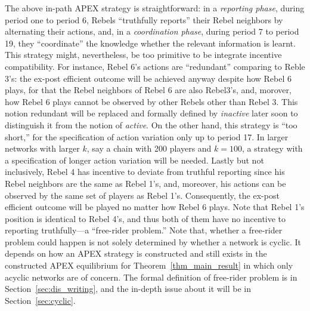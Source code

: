 \documentclass[12pt,letter]{article}
\theoremstyle{definition}
\theoremstyle{remark}
\theoremstyle{claim}
\begin{document}
The above in-path APEX strategy is straightforward: in a \textit{reporting phase}, during period one to period 6, Rebels ``truthfully reports'' their Rebel neighbors by alternating their actions, and, in a \textit{coordination phase}, during period 7 to period 19, they ``coordinate'' the knowledge whether the relevant information is learnt. This strategy might, nevertheless, be too primitive to be integrate incentive compatibility. For instance, Rebel 6's actions are ``redundant'' comparing to Reble 3's: the ex-post efficient outcome will be achieved anyway despite how Rebel 6 plays, for that the Rebel neighbors of Rebel 6 are also Rebel3's, and, morover, how Rebel 6 plays cannot be observed by other Rebels other than Rebel 3. This notion redundant will be replaced and formally defined by \textit{inactive} later soon to distinguish it from the notion of \textit{active}. On the other hand, this strategy is ``too short,'' for the specification of action variation only up to period 17. In larger networks with larger $k$, say a chain with 200 players and $k=100$, a strategy with a specification of longer action variation will be needed. Lastly but not inclusively, Rebel 4 has incentive to deviate from truthful reporting since his Rebel neighbors are the same as Rebel 1's, and, moreover, his actions can be observed by the same set of players as Rebel 1's. Consequently, the ex-post efficient outcome will be played no matter how Rebel 6 plays. Note that Rebel 1's position is identical to Rebel 4's, and thus both of them have no incentive to reporting truthfully---a ``free-rider problem.'' Note that, whether a free-rider problem could happen is not solely determined by whether a network is cyclic. It depends on how an APEX strategy is constructed and still exists in the constructed APEX equilibrium for Theorem~\ref{thm_main_result} in which only acyclic networks are of concern. The formal definition of free-rider problem is in Section~\ref{sec:dis_writing}, and the in-depth issue about it will be in Section~\ref{sec:cyclic}.  
\end{document}
